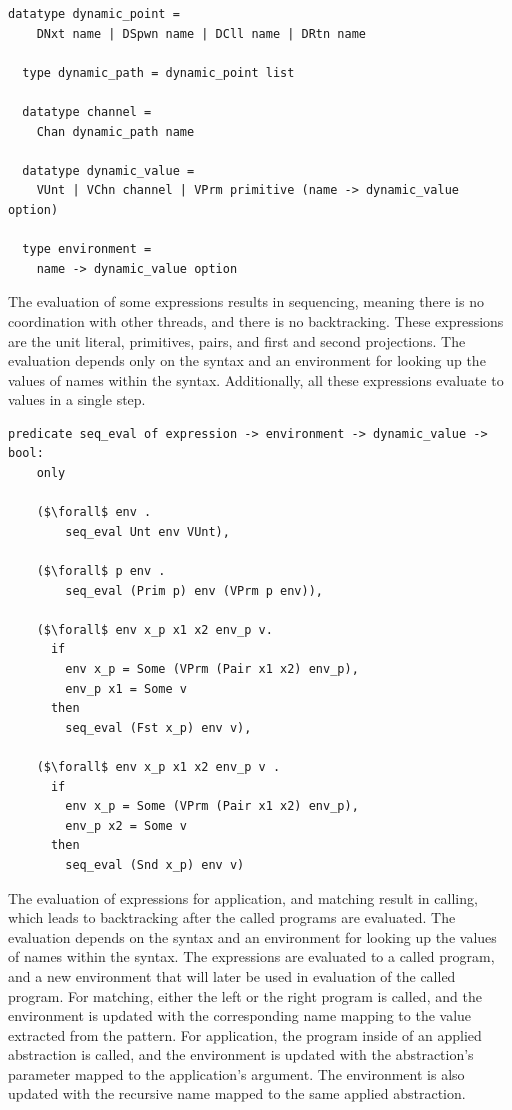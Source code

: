 \documentclass{article}
\begin{document}
\begin{lstlisting}[language=logic]
  datatype dynamic_point =
    DNxt name | DSpwn name | DCll name | DRtn name 

  type dynamic_path = dynamic_point list

  datatype channel =
    Chan dynamic_path name 

  datatype dynamic_value = 
    VUnt | VChn channel | VPrm primitive (name -> dynamic_value option)

  type environment =
    name -> dynamic_value option
  \end{lstlisting}

The evaluation of some expressions results in sequencing, meaning there is no coordination
with other threads, and there is no backtracking. These expressions are the
unit literal, primitives, pairs, and first and second projections. The evaluation depends only
on the syntax and an environment for looking up the values of names within the syntax.
Additionally, all these expressions evaluate to values in a single step.

\begin{lstlisting}[language=logic, mathescape]
  predicate seq_eval of expression -> environment -> dynamic_value -> bool:
    only

    ($\forall$ env . 
        seq_eval Unt env VUnt),
        
    ($\forall$ p env .
        seq_eval (Prim p) env (VPrm p env)),

    ($\forall$ env x_p x1 x2 env_p v. 
      if
        env x_p = Some (VPrm (Pair x1 x2) env_p),
        env_p x1 = Some v
      then
        seq_eval (Fst x_p) env v),

    ($\forall$ env x_p x1 x2 env_p v . 
      if
        env x_p = Some (VPrm (Pair x1 x2) env_p), 
        env_p x2 = Some v 
      then
        seq_eval (Snd x_p) env v)
  \end{lstlisting}

The evaluation of expressions for application, and matching result in calling, which leads to
backtracking after the called programs are evaluated. The evaluation depends on the syntax
and an environment for looking up the values of names within the syntax.
The expressions are evaluated to a called program, and a new environment that will
later be used in evaluation of the called program. For matching, either the left or the right
program is called, and the environment is updated with the corresponding name mapping to the
value extracted from the pattern. For application, the program inside of an applied abstraction
is called, and the environment is updated with the abstraction's parameter mapped to the
application's argument. The environment is also updated with the recursive name mapped to the
same applied abstraction.
\end{document}
